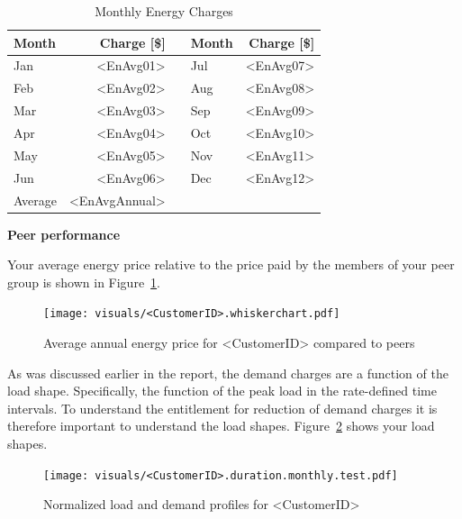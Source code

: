 \documentclass[11pt]{article}
\begin{document}
\begin{table}[th!]
  \centering
  \caption{Monthly Energy Charges}
  \vspace{1.5ex}
  \label{tab:energy}
  \begin{tabular}{p{0.75in}rp{0.2in}p{0.75in}r}
    Month & Charge [\$] & & Month & Charge [\$] \\
    \midrule
    Jan & <EnAvg01> & & Jul & <EnAvg07> \\
    Feb & <EnAvg02> & & Aug & <EnAvg08> \\
    Mar & <EnAvg03> & & Sep & <EnAvg09> \\
    Apr & <EnAvg04> & & Oct & <EnAvg10> \\
    May & <EnAvg05> & & Nov & <EnAvg11> \\
    Jun & <EnAvg06> & & Dec & <EnAvg12> \\
    \midrule
    Average & <EnAvgAnnual> & & &
  \end{tabular}
\end{table}

\vspace{3ex}
\textbf{\Large Peer performance}
\vspace{1ex}

Your average energy price relative to the price paid by the members of your peer group is shown in Figure~\ref{fig:PeerCompEn}.

\begin{figure}[!h]
\centering
\texttt{[image: visuals/<CustomerID>.whiskerchart.pdf]}
\caption{Average annual energy price for <CustomerID> compared to peers}
\label{fig:PeerCompEn}
\end{figure}

\clearpage

\pagestyle{demand}

As was discussed earlier in the report, the demand charges are a function of the load shape.
Specifically, the function of the peak load in the rate-defined time intervals.
To understand the entitlement for reduction of demand charges it is therefore important to understand the load shapes.
Figure~\ref{fig:duration} shows your load shapes.
\begin{figure}[!h]
\centering
\texttt{[image: visuals/<CustomerID>.duration.monthly.test.pdf]}
\caption{Normalized load and demand profiles for <CustomerID>}
\label{fig:duration}
\end{figure}
\end{document}
